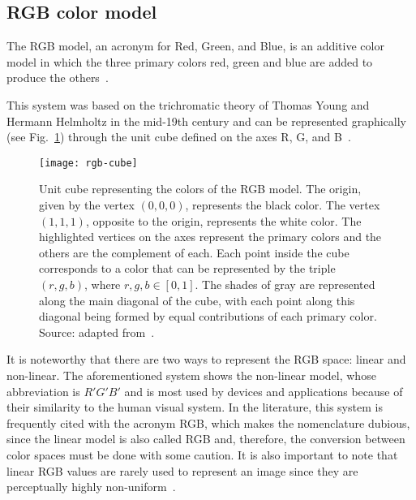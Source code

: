 \subsection{RGB color model}
\label{sec:modelo_cores_rgb}

The RGB model, an acronym for Red, Green, and Blue, is an additive color model in which the three primary colors red, green and blue are added to produce the others~\citep{gonzalez:02}.

This system was based on the trichromatic theory of Thomas Young and Hermann Helmholtz in the mid-19th century and can be represented graphically (see Fig.~\ref{fig:rgb-cube}) through the unit cube defined on the axes R, G, and B~\citep{konstantinos:00}.

\begin{figure}[!ht]
  \centering
  \texttt{[image: rgb-cube]}
  \caption[Unit cube representing the colors of the RGB model]{Unit cube representing the colors of the RGB model. The origin, given by the vertex $(0, 0, 0)$, represents the black color. The vertex $(1, 1, 1)$, opposite to the origin, represents the white color. The highlighted vertices on the axes represent the primary colors and the others are the complement of each. Each point inside the cube corresponds to a color that can be represented by the triple $(r, g, b)$, where $r, g, b \in [0, 1]$. The shades of gray are represented along the main diagonal of the cube, with each point along this diagonal being formed by equal contributions of each primary color. Source: adapted from~\citet{gonzalez:02}.}
  \label{fig:rgb-cube} 
\end{figure}

It is noteworthy that there are two ways to represent the RGB space: linear and non-linear. The aforementioned system shows the non-linear model, whose abbreviation is $R'G'B'$ and is most used by devices and applications because of their similarity to the human visual system. In the literature, this system is frequently cited with the acronym RGB, which makes the nomenclature dubious, since the linear model is also called RGB and, therefore, the conversion between color spaces must be done with some caution. It is also important to note that linear RGB values are rarely used to represent an image since they are perceptually highly non-uniform~\citep{konstantinos:00}.


